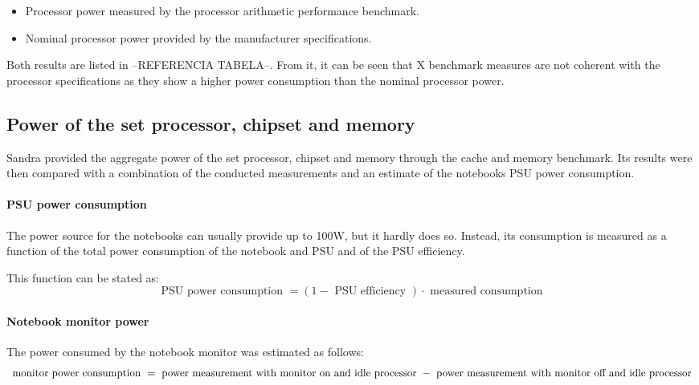         \begin{itemize}
            \item Processor power measured by the processor arithmetic performance benchmark.
            \item Nominal processor power provided by the manufacturer specifications.
        \end{itemize}
        
        Both results are listed in --REFERENCIA TABELA--. From it, it can be seen that X benchmark measures are not coherent with the processor specifications as they show a higher power consumption than the nominal processor power.
        
    \subsection{Power of the set processor, chipset and  memory} \label{sec4:processor_power}
        
        Sandra provided the aggregate power of the set processor, chipset and memory through the cache and memory benchmark. Its results were then compared with a combination of the conducted measurements and an estimate of the notebooks PSU power consumption.
        
        \paragraph*{PSU power consumption}
            
            The power source for the notebooks can usually provide up to 100W, but it hardly does so. Instead, its consumption is measured as a function of the total power consumption of the notebook and PSU and of the PSU efficiency.
            
            This function can be stated as:
            \begin{equation}
                \text{ PSU power consumption } = (1 - \text{ PSU efficiency }) \cdot \text{ measured consumption }
                \label{psu_consumption}
            \end{equation}

        \paragraph*{Notebook monitor power}
        
            The power consumed by the notebook monitor was estimated as follows: 
            \begin{equation}
                \text{ monitor power consumption } = \text{ power measurement with monitor on and idle processor }  - 
                \\
                \text{ power measurement with monitor off and idle processor }
                \label{monitor_consumption}
            \end{equation}
            
